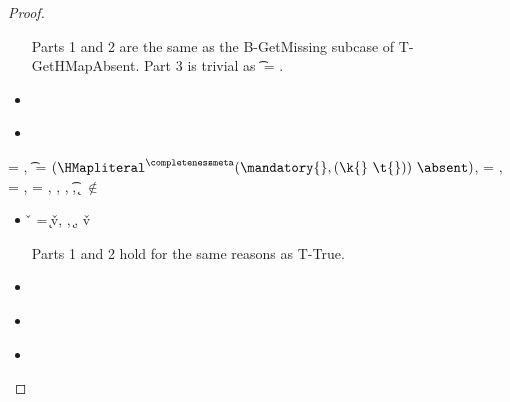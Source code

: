 \begin{lemma}
\begin{proof}
\begin{case}[T-GetHMapPartialDefault]
\begin{itemize}
\begin{subcase}[B-GetMissing]
         Parts 1 and 2 are the same as the B-GetMissing subcase of T-GetHMapAbsent.
         Part 3 is trivial as \t{} = \Top.

      \end{subcase}
    \item[]
      \begin{subcase}[BE-Get1]
      \end{subcase}
    \item[]
      \begin{subcase}[BE-Get2]
      \end{subcase}
  \end{itemize}
\end{case}

\begin{case}[T-AssocHMap]
  \e{} = { {} {}},
  \t{} = ${\HMapgeneric {\extendmandatoryset {\mandatory{}}{\k{}}{\t{}}} {\absent}}$,
  \thenprop{\prop{}} = {\topprop{}},
  \elseprop{\prop{}} = {\botprop{}},
  \object{} = \emptyobject,
  \judgementtwo {\propenv{}} { {\HMapgeneric {\mandatory{}} {\absent}}},
  \judgementtwo {\propenv{}} { {\Value{\k{}}}},
  \judgementtwo {\propenv{}} { {\t{}}},
  {\k{}} $\not\in$ {\absent{}}

  \begin{itemize}
    \item[]
      \begin{subcase}[B-Assoc]
        \v{} = 
        {
                {\k{}}{\v{v}}},
        \opsem {\openv{}}
        {} {},
        \opsem {\openv{}} {} {\k{}},
        \opsem {\openv{}} {} {\v{v}}

        Parts 1 and 2 hold for the same reasons as T-True.
      \end{subcase}
    \item[]
      \begin{subcase}[BE-Assoc1]
      \end{subcase}
    \item[]
      \begin{subcase}[BE-Assoc2]
      \end{subcase}
    \item[]
      \begin{subcase}[BE-Assoc3]
      \end{subcase}
  \end{itemize}
\end{case}


\end{proof}
\end{lemma}
